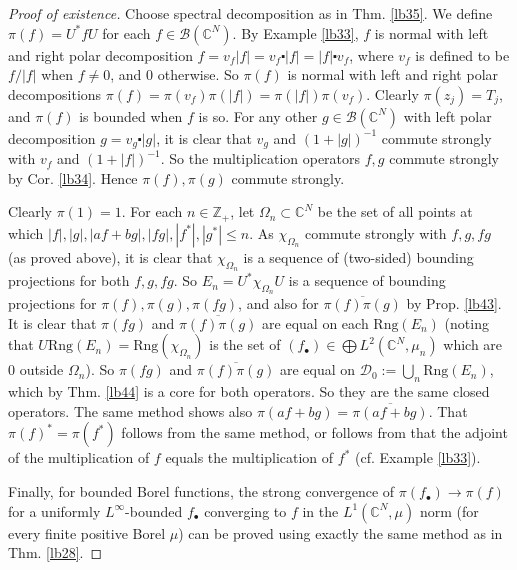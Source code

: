 \documentclass[12pt,a4paper,notitlepage]{article}
\theoremstyle{definition}
\theoremstyle{plain}
\newcommand{\ovl}{\overline}
\newcommand{\Dom}{\scr D}
\newcommand{\scr}{\mathscr}
\newcommand{\blt}{\bullet}
\newcommand{\Cbb}{\mathbb C}
\newcommand{\Zbb}{\mathbb Z}
\newcommand{\Rng}{\mathrm{Rng}}
\numberwithin{equation}{section}
\begin{document}
\begin{proof}[Proof of existence]
Choose spectral decomposition as in Thm. \ref{lb35}. We define $\pi(f)=U^*fU$ for each $f\in\scr B(\Cbb^N)$.	By Example \ref{lb33}, $f$ is normal with left  and right polar decomposition $f=v_f|f|=v_f\centerdot|f|=|f|\centerdot v_f$, where $v_f$ is defined to be $f/|f|$ when $f\neq 0$, and $0$ otherwise. So $\pi(f)$ is normal with left and right polar decompositions $\pi(f)=\pi(v_f)\pi(|f|)=\pi(|f|)\pi(v_f)$. Clearly $\pi(z_j)=T_j$, and $\pi(f)$ is bounded when $f$ is so. For any other $g\in\scr B(\Cbb^N)$ with left polar decomposition $g=v_g\centerdot|g|$, it is clear that $v_g$ and $(1+|g|)^{-1}$ commute strongly with $v_f$ and $(1+|f|)^{-1}$. So the multiplication operators $f,g$ commute strongly by Cor. \ref{lb34}. Hence $\pi(f),\pi(g)$ commute strongly.

Clearly $\pi(1)=1$. For each $n\in\Zbb_+$, let $\Omega_n\subset\Cbb^N$ be the set of all points at which $|f|,|g|,|af+bg|,|fg|,|f^*|,|g^*|\leq n$. As $\chi_{\Omega_n}$ commute strongly with $f,g,fg$ (as proved above), it is clear that $\chi_{\Omega_n}$ is a sequence of (two-sided) bounding projections for both $f,g,fg$. So $E_n=U^*\chi_{\Omega_n}U$ is a sequence of bounding projections for $\pi(f),\pi(g),\pi(fg)$, and also for $\ovl{\pi(f)\pi(g)}$ by Prop. \ref{lb43}. It is clear that $\pi(fg)$ and $\ovl{\pi(f)\pi(g)}$ are equal on each $\Rng(E_n)$ (noting that $U\Rng(E_n)=\Rng(\chi_{\Omega_n})$ is the set of $(f_\blt)\in \bigoplus L^2(\Cbb^N,\mu_n)$ which are $0$ outside $\Omega_n$). So $\pi(fg)$ and $\ovl{\pi(f)\pi(g)}$ are equal on $\Dom_0:=\bigcup_n\Rng(E_n)$, which by Thm. \ref{lb44} is a core for both operators. So they are the same closed operators. The same method shows also $\pi(af+bg)=\ovl{\pi(af+bg)}$. That $\pi(f)^*=\pi(f^*)$ follows from the same method, or follows from that the adjoint of the multiplication of $f$ equals the multiplication of $f^*$ (cf. Example \ref{lb33}).

Finally, for bounded Borel functions, the strong convergence of $\pi(f_\blt)\rightarrow\pi(f)$ for a uniformly $L^\infty$-bounded $f_\blt$ converging to $f$ in the $L^1(\Cbb^N,\mu)$ norm (for every finite positive Borel $\mu$) can be proved using exactly the same method as in Thm. \ref{lb28}.
\end{proof}	
\end{document}
